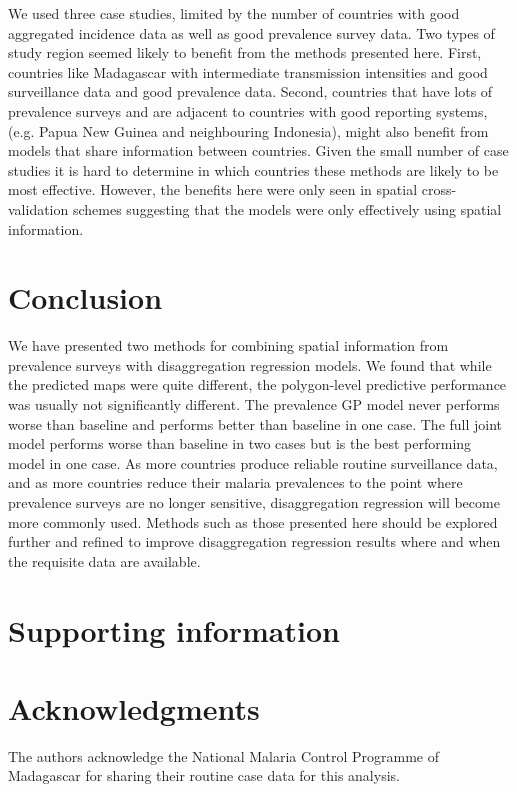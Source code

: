 \documentclass{statsoc}
\begin{document}
We used three case studies, limited by the number of countries with good aggregated incidence data as well as good prevalence survey data.
Two types of study region seemed likely to benefit from the methods presented here.
First, countries like Madagascar with intermediate transmission intensities and good surveillance data and good prevalence data.
Second, countries that have lots of prevalence surveys and are adjacent to countries with good reporting systems, (e.g. Papua New Guinea and neighbouring Indonesia), might also benefit from models that share information between countries.
Given the small number of case studies it is hard to determine in which countries these methods are likely to be most effective.
However, the benefits here were only seen in spatial cross-validation schemes suggesting that the models were only effectively using spatial information.



\section*{Conclusion}


We have presented two methods for combining spatial information from prevalence surveys with disaggregation regression models.
We found that while the predicted maps were quite different, the polygon-level predictive performance was usually not significantly different.
The prevalence GP model never performs worse than baseline and performs better than baseline in one case. 
The full joint model performs worse than baseline in two cases but is the best performing model in one case.
As more countries produce reliable routine surveillance data, and as more countries reduce their malaria prevalences to the point where prevalence surveys are no longer sensitive, disaggregation regression will become more commonly used. 
Methods such as those presented here should be explored further and refined to improve disaggregation regression results where and when the requisite data are available.



\section*{Supporting information}


\section*{Acknowledgments}
The authors acknowledge the National Malaria Control Programme of Madagascar for sharing their routine case data for this analysis.






 
\end{document}
